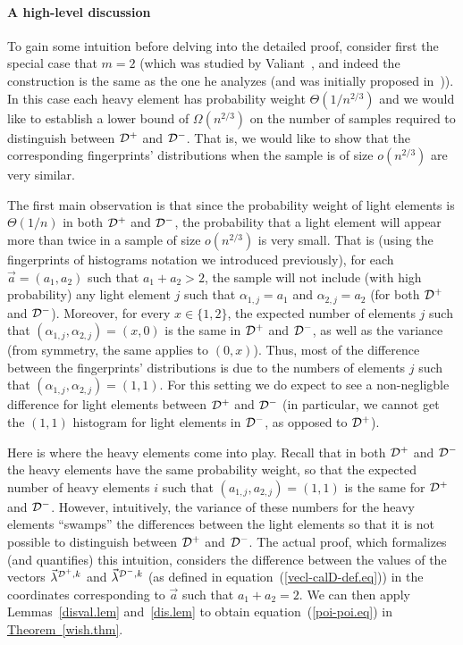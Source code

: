 \documentclass[10pt]{article}
\theoremstyle{definition}
\numberwithin{equation}{section}
\newcommand{\expref}[2]{\texorpdfstring{\hyperref[#2]{#1~\ref{#2}}}{#1~\ref{#2}}}
\newcommand{\calD}{{\cal D}}
\begin{document}
%

\paragraph{A high-level discussion}
To gain some intuition before delving into the detailed proof,
consider first the special case that $m=2$
(which was studied by Valiant~\cite{val}, and indeed the construction is
the same as the one he analyzes (and was initially proposed
in~\cite{BFRSW})).
%
%
In this case
each heavy element has probability weight $\Theta(1/n^{2/3})$ and we would like to
establish a lower bound of $\Omega(n^{2/3})$ on the number of samples required
to distinguish between $\calD^+$ and $\calD^-$. That is, we would like to show that
the corresponding fingerprints' distributions when the sample is of size
$o(n^{2/3})$ are very similar.

The first main observation is that since the probability
weight of light elements is $\Theta(1/n)$ in both $\calD^+$ and $\calD^-$,
the probability that a light element will appear more than twice  in a sample of
size $o(n^{2/3})$ is very small. That is (using the fingerprints of histograms
notation we introduced previously),
 for each $\vec{a} = (a_1,a_2)$ such that $a_1+a_2 > 2$, the sample
will not include (with high probability) any light element
$j$ such that $\alpha_{1,j} = a_1$ and $\alpha_{2,j} = a_2$
(for both $\calD^+$ and $\calD^-$).
Moreover, for every $x\in \{1,2\}$, the expected number of elements $j$ such that $(\alpha_{1,j},\alpha_{2,j}) = (x,0)$ is the same in $\calD^+$ and $\calD^-$, as well as the variance (from symmetry, the same applies to $(0,x)$).
Thus, most of the difference between the
fingerprints' distributions is due to the numbers of elements $j$
such that $(\alpha_{1,j},\alpha_{2,j}) = (1,1)$.
For this setting we do expect to see a non-negligble difference
for light elements between $\calD^+$ and $\calD^-$ (in particular, we cannot
get the $(1,1)$ histogram for light elements in $\calD^-$, as opposed to
$\calD^+$).
%

Here is where the heavy elements come into play. Recall that in both $\calD^+$ and $\calD^-$
the heavy elements have the same probability weight, so that the expected
number of heavy elements $i$ such that $(a_{1,j},a_{2,j}) = (1,1)$ is the same for $\calD^+$ and $\calD^-$. However,
intuitively, the variance of  these numbers for the heavy elements
``swamps'' the differences between the light elements so that it is not possible
to distinguish between  $\calD^+$ and $\calD^-$. The actual proof, which formalizes
(and quantifies)
this intuition, considers the difference between the values of the vectors $\vec{\lambda}^{\calD^+,k}$ and
$\vec{\lambda}^{\calD^-,k}$ (as defined in
equation~(\ref{vecl-calD-def.eq}))
%
in the coordinates corresponding to
$\vec{a}$ such that $a_1 + a_2 = 2$.
We can then apply Lemmas~\ref{disval.lem} and~\ref{dis.lem} to
obtain equation~(\ref{poi-poi.eq}) in \expref{Theorem}{wish.thm}.
\end{document}

